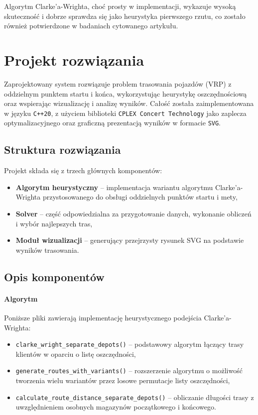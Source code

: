 \documentclass{article}
\begin{document}
Algorytm Clarke’a-Wrighta, choć prosty w implementacji, wykazuje wysoką skuteczność i dobrze sprawdza się jako heurystyka pierwszego rzutu, co zostało również potwierdzone w badaniach cytowanego artykułu.

\section{Projekt rozwiązania}

Zaprojektowany system rozwiązuje problem trasowania pojazdów (VRP) z oddzielnym punktem startu i końca, wykorzystując heurystykę oszczędnościową oraz wspierając wizualizację i analizę wyników. Całość została zaimplementowana w języku \texttt{C++20}, z użyciem biblioteki \texttt{CPLEX Concert Technology} jako zaplecza optymalizacyjnego oraz graficzną prezentacją wyników w formacie \texttt{SVG}.

\subsection*{Struktura rozwiązania}

Projekt składa się z trzech głównych komponentów:
\begin{itemize}
    \item \textbf{Algorytm heurystyczny} -- implementacja wariantu algorytmu Clarke’a-Wrighta przystosowanego do obsługi oddzielnych punktów startu i mety,
    \item \textbf{Solver} -- część odpowiedzialna za przygotowanie danych, wykonanie obliczeń i wybór najlepszych tras,
    \item \textbf{Moduł wizualizacji} -- generujący przejrzysty rysunek SVG na podstawie wyników trasowania.
\end{itemize}

\subsection*{Opis komponentów}

\paragraph{Algorytm}

Poniższe pliki zawierają implementację heurystycznego podejścia Clarke’a-Wrighta:
\begin{itemize}
    \item \texttt{clarke\_wright\_separate\_depots()} -- podstawowy algorytm łączący trasy klientów w oparciu o listę oszczędności,
    \item \texttt{generate\_routes\_with\_variants()} -- rozszerzenie algorytmu o możliwość tworzenia wielu wariantów przez losowe permutacje listy oszczędności,
    \item \texttt{calculate\_route\_distance\_separate\_depots()} -- obliczanie długości trasy z uwzględnieniem osobnych magazynów początkowego i końcowego.
\end{itemize}
\end{document}
